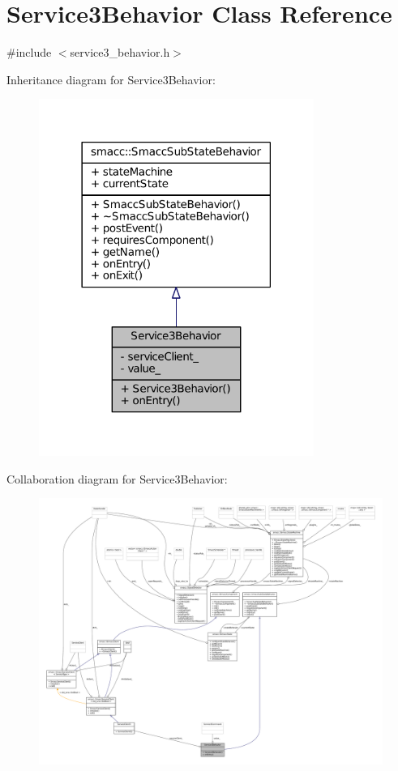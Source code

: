 \hypertarget{classService3Behavior}{}\section{Service3\+Behavior Class Reference}
\label{classService3Behavior}


{\ttfamily \#include $<$service3\+\_\+behavior.\+h$>$}



Inheritance diagram for Service3\+Behavior\+:
\nopagebreak
\begin{figure}[H]
\begin{center}
\leavevmode
\includegraphics[width=254pt]{classService3Behavior__inherit__graph}
\end{center}
\end{figure}


Collaboration diagram for Service3\+Behavior\+:
\nopagebreak
\begin{figure}[H]
\begin{center}
\leavevmode
\includegraphics[width=350pt]{classService3Behavior__coll__graph}
\end{center}
\end{figure}
